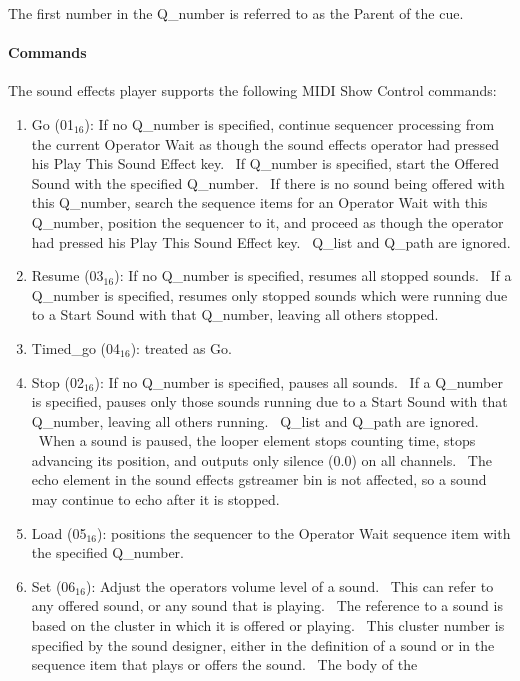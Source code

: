 \documentclass[letterpaper]{article}
\newcommand\textsubscript[1]{\ensuremath{{}_{\text{#1}}}}
\newcommand\liststyleLxvii{%
\renewcommand\theenumi{\arabic{enumi}}
\renewcommand\theenumii{\arabic{enumii}}
\renewcommand\theenumiii{\arabic{enumiii}}
\renewcommand\theenumiv{\arabic{enumiv}}
\renewcommand\labelenumi{\theenumi.}
\renewcommand\labelenumii{\theenumii.}
\renewcommand\labelenumiii{\theenumiii.}
\renewcommand\labelenumiv{\theenumiv.}
}
\begin{document}
The first number in the Q\_number is referred to as the Parent of the
cue.

\paragraph{Commands}
The sound effects player supports the following MIDI Show Control
commands:

\liststyleLxvii
\begin{enumerate}
\item Go (01\textsubscript{16}): If no Q\_number is specified, continue
sequencer processing from the current Operator Wait as though the sound
effects operator had pressed his Play This Sound Effect key. \ If
Q\_number is specified, start the Offered Sound with the specified
Q\_number. \ If there is no sound being offered with this Q\_number,
search the sequence items for an Operator Wait with this Q\_number,
position the sequencer to it, and proceed as though the operator had
pressed his Play This Sound Effect key. \ Q\_list and Q\_path are
ignored.
\item Resume (03\textsubscript{16}): If no Q\_number is specified,
resumes all stopped sounds. \ If a Q\_number is specified, resumes only
stopped sounds which were running due to a Start Sound with that
Q\_number, leaving all others stopped.
\item Timed\_go (04\textsubscript{16}): treated as Go.
\item Stop (02\textsubscript{16}): If no Q\_number is specified, pauses
all sounds. \ If a Q\_number is specified, pauses only those sounds
running due to a Start Sound with that Q\_number, leaving all others
running. \ Q\_list and Q\_path are ignored. \ When a sound is paused,
the looper element stops counting time, stops advancing its position,
and outputs only silence (0.0) on all channels. \ The echo element in
the sound effect{\textquotesingle}s gstreamer bin is not affected, so a
sound may continue to echo after it is stopped.
\item Load (05\textsubscript{16}): positions the sequencer to the
Operator Wait sequence item with the specified Q\_number.
\item Set (06\textsubscript{16}): Adjust the operator{\textquotesingle}s
volume level of a sound. \ This can refer to any offered sound, or any
sound that is playing. \ The reference to a sound is based on the
cluster in which it is offered or playing. \ This cluster number is
specified by the sound designer, either in the definition of a sound or
in the sequence item that plays or offers the sound. \ The body of the

\end{enumerate}
\end{document}
